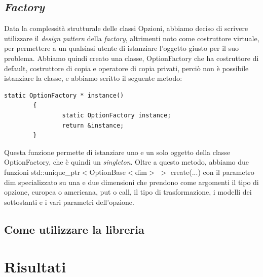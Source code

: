 \documentclass[a4paper,10pt]{report}
\theoremstyle{plain}
\theoremstyle{definition}
\theoremstyle{remark}
\begin{document}
\section{\emph{Factory}}
Data la complessit\`a strutturale delle classi Opzioni, abbiamo deciso di scrivere utilizzare il \emph{design pattern} della \emph{factory}, altrimenti noto come costruttore virtuale, per permettere a un qualsiasi utente di istanziare l'oggetto giusto per il suo problema. Abbiamo quindi creato una classe, \textsf{OptionFactory} che ha costruttore di default, costruttore di copia e operatore di copia privati, perci\`o non \`e possibile istanziare la classe, e abbiamo scritto il seguente metodo:
\begin{lstlisting}
static OptionFactory * instance()
        {
                static OptionFactory instance;
                return &instance;
        }
\end{lstlisting}
Questa funzione permette di istanziare uno e un solo oggetto della classe \textsf{OptionFactory}, che \`e quindi un \emph{singleton}. Oltre a questo metodo, abbiamo due funzioni \textsf{std::unique\_ptr$<$OptionBase$<$dim$>$ $>$ create(...)} con il parametro \textsf{dim} specializzato su una e due dimensioni che prendono come argomenti il tipo di opzione, europea o americana, put o call, il tipo di trasformazione, i modelli dei sottostanti e i vari parametri dell'opzione.
\section{Come utilizzare la libreria}
\chapter{Risultati}
\end{document}
